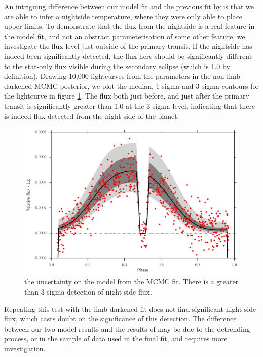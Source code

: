 \documentclass[a4paper,fleqn,usenatbib]{mnras}
\begin{document}
An intriguing difference between our model fit and the previous fit by \citet{Stevenson2014} is that we are able to infer a nightside temperature, where they were only able to place upper limits. To demonstrate that the flux from the nightside is a real feature in the model fit, and not an abstract parameterisation of some other feature, we investigate the flux level just outside of the primary transit. If the nightside has indeed been significantly detected, the flux here should be significantly different to the star-only flux visible during the secondary eclipse (which is 1.0 by definition). Drawing 10,000 lightcurves from the parameters in the non-limb darkened MCMC posterior, we plot the median, 1 sigma and 3 sigma contours for the lightcurve in figure \ref{fig:model}. The flux both just before, and just after the primary transit is significantly greater than 1.0 at the 3 sigma level, indicating that there is indeed flux detected from the night side of the planet.

\begin{figure}
\begin{center}
\includegraphics[width=\columnwidth]{img/model.pdf}
\caption{the uncertainty on the model from the MCMC fit. There is a greater than 3 sigma detection of night-side flux.}
\label{fig:model}
\end{center}
\end{figure}

Repeating this test with the limb darkened fit does not find significant night side flux, which casts doubt on the significance of this detection. The difference between our two model results and the results of \citet{Stevenson2014} may be due to the detrending process, or in the sample of data used in the final fit, and requires more investigation. 
\end{document}
